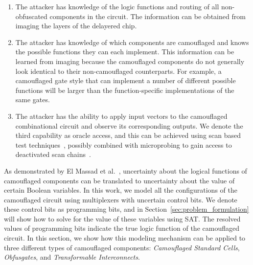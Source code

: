 \documentclass[proposal]{umassthesis}  %
\begin{document}
\begin{enumerate}
\item The attacker has knowledge of the logic functions and routing of all non-obfuscated components in the circuit. The information can be obtained from imaging the layers of the delayered chip.
\item The attacker has knowledge of which components are camouflaged and knows the possible functions they can each implement. This information can be learned from imaging because the camouflaged components do not generally look identical to their non-camouflaged counterparts. For example, a camouflaged gate style that can implement a number of different possible functions will be larger than the function-specific implementations of the same gates.%

\item The attacker has the ability to apply input vectors to the camouflaged combinational circuit and observe its corresponding outputs. We denote the third capability as oracle access, and this can be achieved using scan based test techniques~\cite{yang2004scan},  {possibly combined with microprobing to gain access to deactivated scan chains}~\cite{kommerling1999design}. %
\end{enumerate}

As demonstrated by El Massad et al.~\cite{elmassad-15}, uncertainty about the logical functions of camouflaged components can be translated to uncertainty about the value of certain Boolean variables. In this work, we model all the configurations of the camouflaged circuit using multiplexers with uncertain control bits. We denote these control bits as programming bits, and in Section~\ref{sec:problem_formulation} will show how to solve for the value of these variables using SAT.  The resolved values of programming bits indicate the true logic function of the camouflaged circuit.
In this section, we show how this modeling mechanism can be applied to three different types of camouflaged components: \textit{Camouflaged Standard Cells}, \textit{Obfusgates}, and \textit{Transformable Interconnects}.
\end{document}
